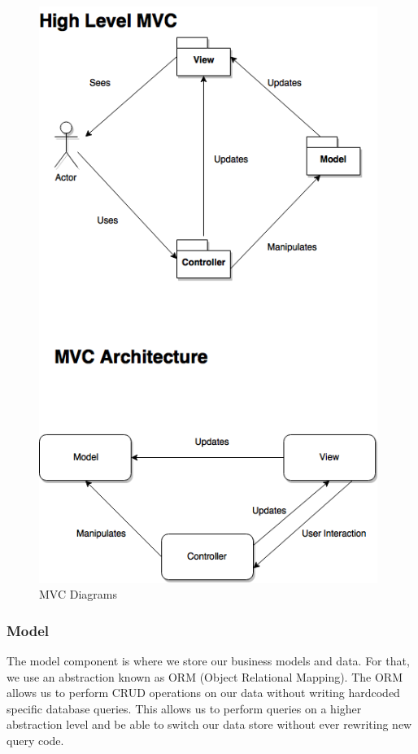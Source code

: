 \documentclass[12pt]{article}
\begin{document}
\begin{figure}[h!]
  \centering
  \includegraphics[width=110mm]{MVC.png}
  \caption{MVC Diagrams}
\end{figure}




\subsubsection{Model}
The model component is where we store our business models and data. For that, we use an abstraction known as ORM (Object Relational Mapping). The ORM allows us to perform CRUD operations on our data without writing hardcoded specific database queries. This allows us to perform queries on a higher abstraction level and be able to switch our data store without ever rewriting new query code. 
\end{document}
